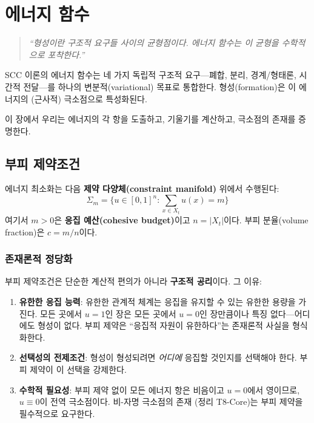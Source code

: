 
\chapter{에너지 함수}
\label{ch:energy}

\begin{quote}
\textit{``형성이란 구조적 요구들 사이의 균형점이다. 에너지 함수는 이 균형을 수학적으로 포착한다.''}
\end{quote}

SCC 이론의 에너지 함수는 네 가지 독립적 구조적 요구---폐합, 분리, 경계/형태론, 시간적 전달---를 하나의 변분적(variational) 목표로 통합한다. 형성(formation)은 이 에너지의 (근사적) 극소점으로 특성화된다.

이 장에서 우리는 에너지의 각 항을 도출하고, 기울기를 계산하고, 극소점의 존재를 증명한다.


\section{부피 제약조건}
\label{sec:volume-constraint}

에너지 최소화는 다음 \textbf{제약 다양체(constraint manifold)} 위에서 수행된다:
\begin{equation}
    \Sigma_m = \Big\{u \in [0,1]^n : \sum_{x \in X_t} u(x) = m\Big\}
    \label{eq:sigma-m}
\end{equation}
여기서 $m > 0$은 \textbf{응집 예산(cohesive budget)}이고 $n = |X_t|$이다. 부피 분율(volume fraction)은 $c = m/n$이다.

\subsection{존재론적 정당화}

부피 제약조건은 단순한 계산적 편의가 아니라 \textbf{구조적 공리}이다. 그 이유:

\begin{enumerate}
    \item \textbf{유한한 응집 능력}: 유한한 관계적 체계는 응집을 유지할 수 있는 유한한 용량을 가진다. 모든 곳에서 $u = 1$인 장은 모든 곳에서 $u = 0$인 장만큼이나 특징 없다---어디에도 형성이 없다. 부피 제약은 ``응집적 자원이 유한하다''는 존재론적 사실을 형식화한다.

    \item \textbf{선택성의 전제조건}: 형성이 형성되려면 \emph{어디에} 응집할 것인지를 선택해야 한다. 부피 제약이 이 선택을 강제한다.

    \item \textbf{수학적 필요성}: 부피 제약 없이 모든 에너지 항은 비음이고 $u = 0$에서 영이므로, $u \equiv 0$이 전역 극소점이다. 비-자명 극소점의 존재 (정리 T8-Core)는 부피 제약을 필수적으로 요구한다.
\end{enumerate}

